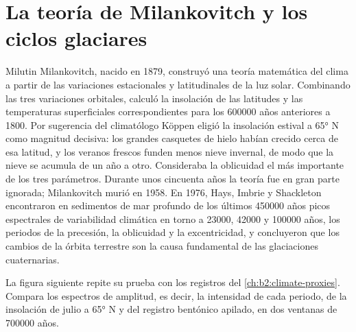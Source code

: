 \section{La teoría de Milankovitch y los ciclos glaciares}\label{sec:b2:orbital-forcing:theory}

\begin{history}
Milutin Milankovitch, nacido en 1879, construyó una teoría matemática del clima a partir de las variaciones estacionales y latitudinales de la luz solar. Combinando las tres variaciones orbitales,
calculó la insolación de las latitudes y las temperaturas superficiales correspondientes para
los \num{600000} años anteriores a 1800. Por sugerencia del climatólogo Köppen eligió la insolación
estival a \ang{65} N como magnitud decisiva: los grandes casquetes de hielo habían crecido cerca de esa
latitud, y los veranos frescos funden menos nieve invernal, de modo que la nieve se acumula de un año
a otro. Consideraba la oblicuidad el más importante de los tres parámetros. Durante unos cincuenta años
la teoría fue en gran parte ignorada; Milankovitch murió en 1958. En 1976, Hays, Imbrie y Shackleton
encontraron en sedimentos de mar profundo de los últimos \num{450000} años picos espectrales de variabilidad climática
en torno a \num{23000}, \num{42000} y \num{100000} años, los periodos de la precesión, la oblicuidad y la
excentricidad, y concluyeron que los cambios de la órbita terrestre son la causa fundamental de las
glaciaciones cuaternarias.
\end{history}

La figura siguiente repite su prueba con los registros del \cref{ch:b2:climate-proxies}. Compara los
espectros de amplitud, es decir, la intensidad de cada periodo, de la insolación de julio a \ang{65} N y del
registro bentónico apilado, en dos ventanas de \num{700000} años.

